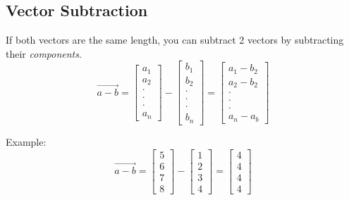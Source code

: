\documentclass[12pt]{report}
\begin{document}
        \subsection{Vector Subtraction}
            If both vectors are the same length, you can subtract 2 vectors by subtracting their \emph{components}.
            \begin{equation}
                \vec{a - b} =
                    \begin{bmatrix} a_1 \\ a_2 \\ \cdot \\ \cdot \\ \cdot \\ a_n \end{bmatrix} -
                    \begin{bmatrix} b_1 \\ b_2 \\ \cdot \\ \cdot \\ \cdot \\ b_n \end{bmatrix} =
                    \begin{bmatrix} a_1 - b_2 \\ a_2 - b_2 \\ \cdot \\ \cdot \\ \cdot \\ a_n - a_b \end{bmatrix}
            \end{equation}

            Example:
            \begin{equation}
                \vec{a - b} =
                    \begin{bmatrix} 5 \\ 6 \\ 7 \\ 8 \end{bmatrix} -
                    \begin{bmatrix} 1 \\ 2 \\ 3 \\ 4 \end{bmatrix} =
                    \begin{bmatrix} 4 \\ 4 \\ 4 \\ 4 \end{bmatrix}
            \end{equation}
\end{document}
